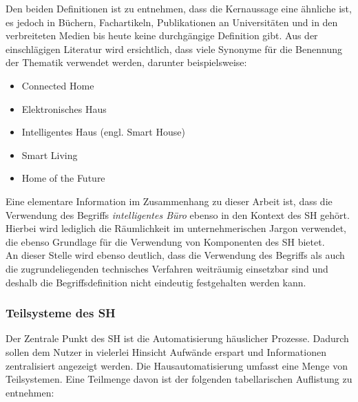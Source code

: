     Den beiden Definitionen ist zu entnehmen, dass die Kernaussage eine ähnliche ist, es jedoch in Büchern, Fachartikeln, 
    Publikationen an Universitäten und in den verbreiteten Medien bis heute keine durchgängige Definition gibt. Aus der
    einschlägigen Literatur wird ersichtlich, dass viele Synonyme für die Benennung der Thematik verwendet werden, darunter 
    beispielsweise: \cite{strese.2010m}
    \begin{itemize}
        \item Connected Home
        \item Elektronisches Haus
        \item Intelligentes Haus (engl. Smart House)
        \item Smart Living
        \item Home of the Future 
    \end{itemize}
    Eine elementare Information im Zusammenhang zu dieser Arbeit ist, dass die Verwendung des Begriffs \textit{intelligentes Büro} 
    ebenso in den Kontext des \acl{SH} gehört. Hierbei wird lediglich die Räumlichkeit im unternehmerischen Jargon verwendet, 
    die ebenso Grundlage für die Verwendung von Komponenten des \acl{SH} bietet. 
    \\
    An dieser Stelle wird ebenso deutlich, dass die Verwendung des Begriffs als auch die zugrundeliegenden technisches Verfahren 
    weiträumig einsetzbar sind und deshalb die Begriffsdefinition nicht eindeutig festgehalten werden kann. 
    
    \subsubsection*{Teilsysteme des \acl{SH}}
        Der Zentrale Punkt des \acl{SH} ist die Automatisierung häuslicher Prozesse. Dadurch sollen dem Nutzer 
        in vielerlei Hinsicht Aufwände erspart und Informationen zentralisiert angezeigt werden. Die Hausautomatisierung 
        umfasst eine Menge von Teilsystemen. Eine Teilmenge davon ist der folgenden tabellarischen Auflistung zu entnehmen: 

